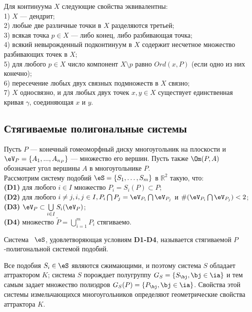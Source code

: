 Для континуума $X$ следующие свойства эквивалентны:\\
1) $X$ --- дендрит;\\
2) любые две различные точки в $X$ разделяются третьей;\\
3) всякая точка $p\in X$ --- либо конец, либо разбивающая точка;\\
4) всякий невырожденный подконтинуум в $X$ содержит несчетное множество разбивающих точек в $X$;\\
5) для любого $p \in X$ число компонент $X \setminus p$ равно $Ord(x,P)$ (если одно из них конечно);\\
6) пересечение любых двух связных подмножеств в $X$ связно;\\
7) $X$ односвязно, и для любых двух точек $x,y \in X$ существует единственная кривая $\gamma$, соединяющая $x$ и $y$.

\subsection{Стягиваемые полигональные системы}

Пусть $P$ --- конечный гомеоморфный  диску многоугольник на плоскости и $\eV_P=\{A_1,...,A_{n_P}\}$ --- множество  его вершин. Пусть также $\Om(P,A)$ обозначает угол вершины $A$ в многоугольнике $P$.\\

Рассмотрим систему подобий $\eS = \{S_1, \ldots, S_m\}$ в ${\mathbb{R}}^2$ такую, что:\\
{\bf (D1)} для любого $i \in I$ множество $P_i = S_i (P) \subset P$;\\ 
{\bf (D2)} для любого $i \ne j, i, j \in I, P_i \bigcap P_j =  \eV_{P_i} \bigcap  \eV_{P_j}$ и $\#(\eV_{P_i} \bigcap  \eV_{P_j})<2$;\\  
{\bf (D3)} $\eV_P \subset \bigcup \limits_{i \in I} S_i (\eV_P)$;\\
{\bf (D4)} множество $\widetilde P = \bigcup \limits_{i = 1} ^m P_i$ стягиваемо.\\

\begin{definition}
Система \ $\eS $, удовлетворяющая условиям {\bf D1-D4},
называется  стягиваемой $P$-полигональной системой подобий.
\end{definition}

Все подобия $S_i\in \eS$ являются сжимающими, и поэтому система $S$ обладает  аттрактором $K$; система  $S$ порождает полугруппу $G_S=\{S_\bj,\bj\in \ia\}$ и тем самым задает множество полиэдров  $G_S(P)=\{P_\bj, \bj\in\ia\}$. Свойства этой системы измельчающихся многоугольников определяют геометрические свойства аттрактора $K$.\\

